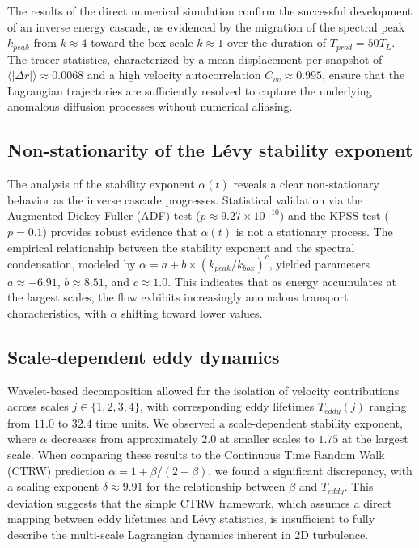 \documentclass[]{article}
\begin{document}
The results of the direct numerical simulation confirm the successful development of an inverse energy cascade, as evidenced by the migration of the spectral peak $k_{peak}$ from $k \approx 4$ toward the box scale $k \approx 1$ over the duration of $T_{prod} = 50 T_L$. The tracer statistics, characterized by a mean displacement per snapshot of $\langle|\Delta r|\rangle \approx 0.0068$ and a high velocity autocorrelation $C_{vv} \approx 0.995$, ensure that the Lagrangian trajectories are sufficiently resolved to capture the underlying anomalous diffusion processes without numerical aliasing.

\subsection{Non-stationarity of the Lévy stability exponent}
The analysis of the stability exponent $\alpha(t)$ reveals a clear non-stationary behavior as the inverse cascade progresses. Statistical validation via the Augmented Dickey-Fuller (ADF) test ($p \approx 9.27 \times 10^{-10}$) and the KPSS test ($p = 0.1$) provides robust evidence that $\alpha(t)$ is not a stationary process. The empirical relationship between the stability exponent and the spectral condensation, modeled by $\alpha = a + b \times (k_{peak}/k_{box})^c$, yielded parameters $a \approx -6.91$, $b \approx 8.51$, and $c \approx 1.0$. This indicates that as energy accumulates at the largest scales, the flow exhibits increasingly anomalous transport characteristics, with $\alpha$ shifting toward lower values.

\subsection{Scale-dependent eddy dynamics}
Wavelet-based decomposition allowed for the isolation of velocity contributions across scales $j \in \{1, 2, 3, 4\}$, with corresponding eddy lifetimes $T_{eddy}(j)$ ranging from $11.0$ to $32.4$ time units. We observed a scale-dependent stability exponent, where $\alpha$ decreases from approximately $2.0$ at smaller scales to $1.75$ at the largest scale. When comparing these results to the Continuous Time Random Walk (CTRW) prediction $\alpha = 1 + \beta/(2-\beta)$, we found a significant discrepancy, with a scaling exponent $\delta \approx 9.91$ for the relationship between $\beta$ and $T_{eddy}$. This deviation suggests that the simple CTRW framework, which assumes a direct mapping between eddy lifetimes and Lévy statistics, is insufficient to fully describe the multi-scale Lagrangian dynamics inherent in 2D turbulence.
\end{document}
